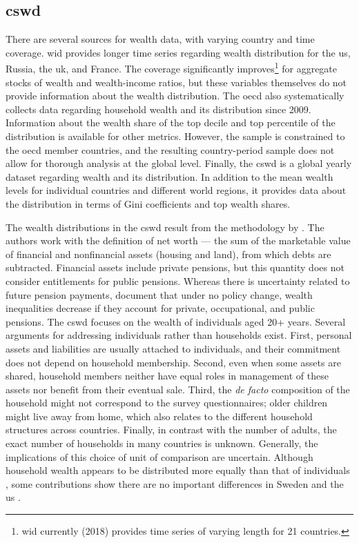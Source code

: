 \documentclass[a4paper,11pt]{article}
\begin{document}
\subsection{\ac{cswd}}
There are several sources for wealth data, with varying country and time coverage. \ac{wid} provides longer time series regarding wealth distribution for the \ac{us}, Russia, the \ac{uk}, and France. The coverage significantly improves\footnote{\ac{wid} currently (2018) provides time series of varying length for 21 countries.} for aggregate stocks of wealth and wealth-income ratios, but these variables themselves do not provide information about the wealth distribution. The \ac{oecd} also systematically collects data regarding household wealth and its distribution since 2009. Information about the wealth share of the top decile and top percentile of the distribution is available for other metrics. However, the sample is constrained to the \ac{oecd} member countries, and the resulting country-period sample does not allow for thorough analysis at the global level. Finally, the \ac{cswd} is a global yearly dataset regarding wealth and its distribution. In addition to the mean wealth levels for individual countries and different world regions, it provides data about the distribution in terms of Gini coefficients and top wealth shares.

The wealth distributions in the \ac{cswd} result from the methodology by \citet{daviesetal2017}. The authors work with the definition of net worth --- the sum of the marketable value of financial and nonfinancial assets (housing and land), from which debts are subtracted. Financial assets include private pensions, but this quantity does not consider entitlements for public pensions. Whereas there is uncertainty related to future pension payments, \citet{bonke2017} document that under no policy change, wealth inequalities decrease if they account for private, occupational, and public pensions. The \ac{cswd} focuses on the wealth of individuals aged 20+ years. Several arguments for addressing individuals rather than households exist. First, personal assets and liabilities are usually attached to individuals, and their commitment does not depend on household membership. Second, even when some assets are shared, household members neither have equal roles in management of these assets nor benefit from their eventual sale. Third, the \textit{de facto} composition of the household might not correspond to the survey questionnaires; older children might live away from home, which also relates to the different household structures across countries. Finally, in contrast with the number of adults, the exact number of households in many countries is unknown. Generally, the implications of this choice of unit of comparison are uncertain. Although household wealth appears to be distributed more equally than that of individuals \citet{atkinson2007top}, some contributions show there are no important differences in Sweden and the \ac{us} \citep{roine2009wealth,kopczuksaez2004}. 
\end{document}
